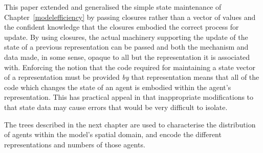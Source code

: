 This paper extended and generalised the simple state maintenance of
Chapter~\ref{modelefficiency} by passing closures rather than a vector
of values and the confident knowledge that the closures embodied the
correct process for update. By using closures, the actual machinery
supporting the update of the state of a previous representation can be
passed and both the mechanism and data made, in some sense, opaque to
all but the representation it is associated with. Enforcing the notion
that the code required for maintaining a state vector of a
representation must be provided \emph{by} that representation means
that all of the code which changes the state of an agent is embodied
within the agent's representation.  This has practical appeal in that
inappropriate modifications to that state data may cause errors that
would be very difficult to isolate.

The trees described in the next chapter are used to characterise the
distribution of agents within the model's spatial domain, and encode
the different representations and numbers of those agents. 
